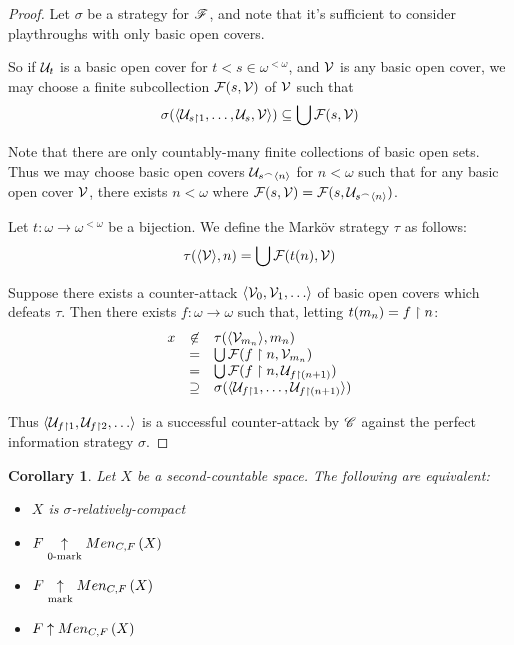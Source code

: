 \documentclass{amsart}
\newtheorem{corollary}[theorem]{Corollary}
\theoremstyle{definition}
\begin{document}
\begin{proof}
  Let \(\sigma\) be a strategy for \(\mathscr{F}\), and note that
  it's sufficient to consider playthroughs with only basic open covers.

  So if \(\mathcal{U}_t\) is a basic open cover for \(t<s\in\omega^{<\omega}\), and
  \(\mathcal{V}\) is any basic open cover, we may choose a finite subcollection
  \(\mathcal{F}(s,\mathcal{V})\) of \(\mathcal{V}\) such that
  \[
    \sigma(\langle\mathcal{U}_{s\restriction 1},\dots,\mathcal{U}_{s},\mathcal{V}\rangle)
      \subseteq
    \bigcup \mathcal{F}(s,\mathcal{V})
  \]

  Note that there are only countably-many finite collections of basic open sets.
  Thus we may choose basic open covers \(\mathcal{U}_{s{^\frown}\langle n\rangle}\) for \(n<\omega\)
  such that for any basic open cover \(\mathcal{V}\), there exists \(n<\omega\) where
  \(\mathcal{F}(s,\mathcal{V})=\mathcal{F}(s,\mathcal{U}_{s{^\frown}\langle n\rangle})\).

  Let \(t:\omega\to\omega^{<\omega}\) be a bijection. We define the Mark\"ov
  strategy \(\tau\) as follows:
  \[
    \tau(\langle\mathcal{V}\rangle, n)
      =
    \bigcup \mathcal{F}(t(n),\mathcal{V})
  \]

  Suppose there exists a counter-attack \(\<\mc V_0,\mc V_1,\dots\>\) of
  basic open covers which defeats \(\tau\). Then there exists
  \(f:\omega\to\omega\) such that, letting \(t(m_n)=f\restriction n\):
  \[
    \begin{array}{rcl}
    x & \not\in & \tau(\langle\mathcal{V}_{m_n}\rangle,m_n) \\
    & = & \bigcup\mathcal{F}(f\restriction n,\mathcal{V}_{m_n}) \\
    & = & \bigcup\mathcal{F}(f\restriction n,\mathcal{U}_{f\restriction (n+1)}) \\
    & \supseteq & \sigma(\langle\mathcal{U}_{f\restriction 1},\dots,\mathcal{U}_{f\restriction(n+1)}\rangle)
    \end{array}
  \]

  Thus \(\<\mc U_{f\rest 1}, \mc U_{f\rest 2},\dots\>\) is a successful
  counter-attack by \(\mathscr{C}\) against the perfect information strategy \(\sigma\).
\end{proof}

\begin{corollary}
  Let \(X\) be a second-countable space. The following are equivalent:
  \begin{itemize}
    \item \(X\) is \(\sigma\)-relatively-compact
    \item \(F \underset{0\text{-mark}}{\uparrow} Men_{C,F}\left({X}\right)\)
    \item \(F \underset{\text{mark}}{\uparrow} Men_{C,F}\left({X}\right)\)
    \item \(F \uparrow Men_{C,F}\left({X}\right)\)
  \end{itemize}
\end{corollary}
\end{document}
